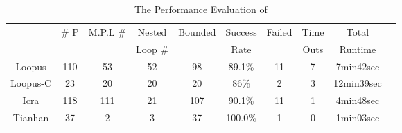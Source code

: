 





\begin{table}[H]
    \caption{The Performance Evaluation of {\THESYSTEM}}
    \label{tb:performance-eval}
    \centering
        {\footnotesize
        \begin{tabular}{ >{\small}c | c | c | c | c | c | c | c | c | c }
        \multirow{2}{*}{Benchmark} & \multirow{2}{*}{\# P}  & \multirow{2}{*}{M.P.L \#} & Nested  & \multirow{2}{*}{Bounded} & {Success} & \multirow{2}{*}{Failed} & Time  & Total\\
         &  &  & Loop \# & & Rate &  & Outs &   Runtime \\
        \hline
            {Loopus} & {110}  & 53  & 52  & 98 & 89.1\% & 11 & 7 & 7min42sec \\
            \hline
            Loopus-C & 23  & 20 & 20 & {20} & {86\%}  & 2 & 3 & {12min39sec} \\
            \hline
            {Icra} & 118 & 111 & 21 & 107 & 90.1\% & 11 & 1 & {4min48sec} \\
            \hline
            Tianhan & 37 & 2 & 3 & 37 & 100.0\% & 1 & 0 & 1min03sec \\
            \hline
        \end{tabular}
        }
    \end{table}

